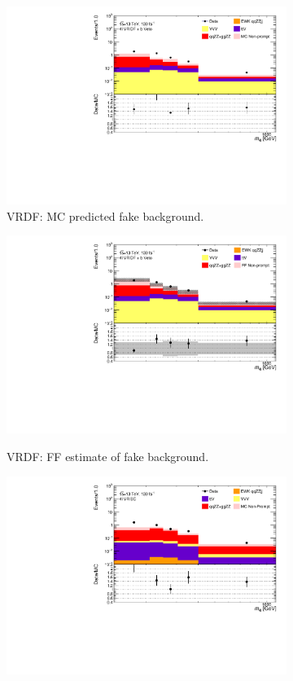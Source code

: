 \begin{figure}[htb]
    \centering
    \begin{subfigure}{.48\textwidth}
        \centering
        \includegraphics[width = 0.85\linewidth]{figures/Analysis/Background/Overlay_VRDF_RedMC_M4l.pdf}
        \caption{VRDF: MC predicted fake background.\label{subfig:VRDFMCRed}}
    \end{subfigure}
    \begin{subfigure}{.48\textwidth}
        \centering
        \includegraphics[width = 0.85\linewidth]{figures/Analysis/Background/Overlay_VRDF_FFApplied_M4l.pdf}\\
        \caption{ VRDF: FF estimate of fake background. \label{subfig:VRDFFF} }
    \end{subfigure}
    \begin{subfigure}{.48\textwidth}
        \centering
        \includegraphics[width = 0.85\linewidth]{figures/Analysis/Background/Overlay_VRSC_RedMC_M4l.pdf}

\end{subfigure}
\end{figure}
